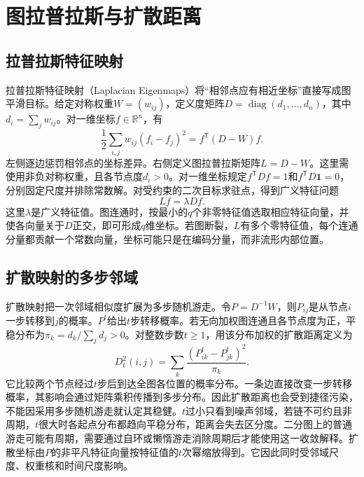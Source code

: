 \section{图拉普拉斯与扩散距离}
\subsection{拉普拉斯特征映射}
拉普拉斯特征映射（Laplacian Eigenmaps）将“相邻点应有相近坐标”直接写成图平滑目标\cite{belkin2003laplacian}。给定对称权重$W=(w_{ij})$，定义度矩阵$D=\operatorname{diag}(d_1,\ldots,d_n)$，其中$d_i=\sum_jw_{ij}$。对一维坐标$f\in\mathbb R^n$，有
\begin{equation}
 \frac12\sum_{i,j}w_{ij}(f_i-f_j)^2=f^{\mathsf T}(D-W)f.
 \label{eq:laplacian-energy}
\end{equation}
左侧逐边惩罚相邻点的坐标差异。右侧定义图拉普拉斯矩阵$L=D-W$。这里需使用非负对称权重，且各节点度$d_i>0$。对一维坐标规定$f^{\mathsf T}Df=1$和$f^{\mathsf T}D\bm1=0$，分别固定尺度并排除常数解。对受约束的二次目标求驻点，得到广义特征问题
\begin{equation}
 Lf=\lambda Df.
 \label{eq:laplacian-eigenproblem}
\end{equation}
这里$\lambda$是广义特征值。图连通时，按最小的$q$个非零特征值选取相应特征向量，并使各向量关于$D$正交，即可形成$q$维坐标。若图断裂，$L$有多个零特征值，每个连通分量都贡献一个常数向量，坐标可能只是在编码分量，而非流形内部位置。

\subsection{扩散映射的多步邻域}
扩散映射把一次邻域相似度扩展为多步随机游走\cite{coifman2006diffusion}。令$P=D^{-1}W$，则$P_{ij}$是从节点$i$一步转移到$j$的概率。$P^t$给出$t$步转移概率。若无向加权图连通且各节点度为正，平稳分布为$\pi_k=d_k/\sum_jd_j>0$。对整数步数$t\geq1$，用该分布加权的扩散距离定义为
\begin{equation}
 D_t^2(i,j)=\sum_{k}\frac{(P^t_{ik}-P^t_{jk})^2}{\pi_k}.
 \label{eq:diffusion-distance}
\end{equation}
它比较两个节点经过$t$步后到达全图各位置的概率分布。一条边直接改变一步转移概率，其影响会通过矩阵乘积传播到多步分布。因此扩散距离也会受到捷径污染，不能因采用多步随机游走就认定其稳健。$t$过小只看到噪声邻域，若链不可约且非周期，$t$很大时各起点分布都趋向平稳分布，距离会失去区分度。二分图上的普通游走可能有周期，需要通过自环或懒惰游走消除周期后才能使用这一收敛解释。扩散坐标由$P$的非平凡特征向量按特征值的$t$次幂缩放得到。它因此同时受邻域尺度、权重核和时间尺度影响。

